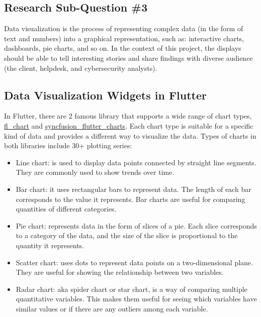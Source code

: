 \begin{multicols}{2}
      \section{Research Sub-Question \#3}
      Data visualization is the process of representing complex data (in the form of text and numbers) into a
      graphical representation, such as: interactive charts, dashboards, pie charts, and so on. In the context
      of this project, the displays should be able to tell interesting stories and share findings with diverse
      audience (the client, helpdesk, and cybersecurity analysts).

      \subsection{Data Visualization Widgets in Flutter}
      In Flutter, there are 2 famous library that supports a wide range of chart types,
      \href{https://pub.dev/packages/fl_chart}{fl\_chart} and
      \href{https://pub.dev/packages/syncfusion_flutter_charts}{syncfusion\_flutter\_charts}. Each chart type is
      suitable for a specific kind of data and provides a different way to visualize the data. Types of charts in
      both libraries include 30+ plotting series:
      \begin{itemize}
            \item Line chart: is used to display data points connected by straight line segments. They are commonly
                  used to show trends over time.
            \item Bar chart: it uses rectangular bars to represent data. The length of each bar corresponds to the
                  value it represents. Bar charts are useful for comparing quantities of different categories.
            \item Pie chart: represents data in the form of slices of a pie. Each slice corresponds to a category
                  of the data, and the size of the slice is proportional to the quantity it represents.
            \item Scatter chart: uses dots to represent data points on a two-dimensional plane. They are useful
                  for showing the relationship between two variables.
            \item Radar chart: \acrshort{aka} spider chart or star chart, is a way of comparing multiple
                  quantitative variables. This makes them useful for seeing which variables have similar values
                  or if there are any outliers among each variable.
      \end{itemize}
\end{multicols}

